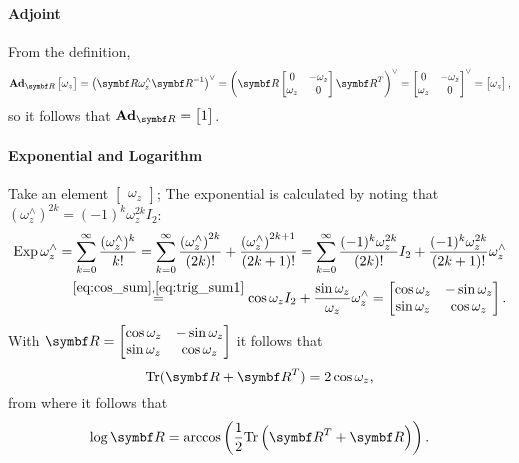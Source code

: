 \paragraph{Adjoint}

From the definition,
\begin{equation}
  \bAd_{\bR} \begin{bmatrix} \omega_{z} \end{bmatrix}
  = \left( \bR \omega_{z}^{\wedge} \bR^{-1} \right)^{\vee} = \left(\bR \begin{bmatrix} 0 & -\omega_{z} \\ \omega_{z} & 0 \end{bmatrix} \bR^T \right)^{\vee} = \begin{bmatrix} 0 & -\omega_{z} \\ \omega_{z} & 0 \end{bmatrix}^{\vee} = \begin{bmatrix} \omega_{z} \end{bmatrix},
\end{equation}
so it follows that $\bAd_{\bR} = \begin{bmatrix} 1 \end{bmatrix}$.

\paragraph{Exponential and Logarithm}

Take an element $\begin{bmatrix}\omega_z\end{bmatrix}$; The exponential is calculated by noting that $(\omega_z^\wedge)^{2k} = (-1)^{k} \omega_z^{2k} I_2$:
\begin{equation}
  \begin{aligned}
    \operatorname{Exp} {\omega_z^\wedge} = \sum_{k = 0}^{\infty} \frac{(\omega_z^\wedge)^k}{k!} = \sum_{k = 0}^{\infty} \frac{\left(\omega_{z}^{\wedge}\right)^{2k}}{(2k)!} + \frac{\left(\omega_{z}^{\wedge}\right)^{2k + 1}}{(2k + 1)!} = \sum_{k = 0}^{\infty} \frac{(-1)^{k} \omega_{z}^{2k}}{(2k)!} I_{2} + \frac{(-1)^{k} \omega_{z}^{2k}}{(2k + 1)!} \omega_{z}^{\wedge} \\
    \overset{\eqref{eq:cos_sum}, \eqref{eq:trig_sum1}}= \cos \omega_z I_2 + \frac{\sin \omega_{z}}{\omega_{z}} \omega_z^\wedge = \begin{bmatrix} \cos \omega_z & - \sin \omega_z \\ \sin \omega_z & \cos \omega_z \end{bmatrix}.
  \end{aligned}
\end{equation}
With $\bR = \begin{bmatrix} \cos \omega_z & -\sin \omega_z \\ \sin \omega_z & \cos \omega_z \end{bmatrix}$ it follows that
\begin{equation}
  \tr (\bR + \bR^T) = 2 \cos \omega_z,
\end{equation}
from where it follows that
\begin{equation}
  \log \bR = \arccos \left( \frac{1}{2} \tr \left( \bR^T + \bR \right) \right).
\end{equation}


